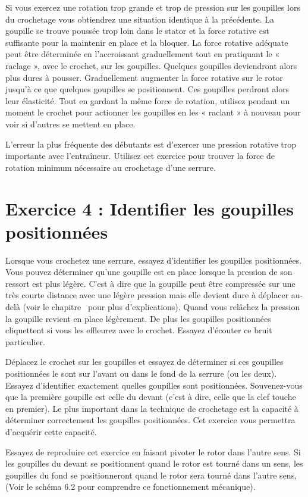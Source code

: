 \documentclass[a4paper,french,11pt,twoside]{report}
\begin{document}
Si vous exercez une rotation trop grande et trop de pression sur les goupilles lors du crochetage vous obtiendrez une situation identique à la précédente. La goupille se trouve poussée trop loin dans le stator et la force rotative est suffisante pour la maintenir en place et la bloquer. La force rotative adéquate peut être déterminée en l'accroissant graduellement tout en pratiquant le « raclage », avec le crochet, sur les goupilles. Quelques goupilles deviendront alors plus dures à pousser. Graduellement augmenter la force rotative sur le rotor jusqu'à ce que quelques goupilles se positionnent. Ces goupilles perdront alors leur élasticité. Tout en gardant la même force de rotation, utilisez pendant un moment le crochet pour actionner les goupilles en les « raclant » à nouveau pour voir si d'autres se mettent en place.

L'erreur la plus fréquente des débutants est d'exercer une pression rotative trop importante avec l'entraîneur. Utilisez cet exercice pour trouver la force de rotation minimum nécessaire au crochetage d'une serrure.

\section{Exercice 4 : Identifier les goupilles positionnées}

Lorsque vous crochetez une serrure, essayez d'identifier les goupilles positionnées. Vous pouvez déterminer qu'une goupille est en place lorsque la pression de son ressort est plus légère. C'est à dire que la goupille peut être compressée sur une très courte distance avec une légère pression mais elle devient dure à déplacer au-delà (voir le chapitre~ pour plus d'explications). Quand vous relâchez la pression la goupille revient en place légèrement. De plus les goupilles positionnées cliquettent si vous les effleurez avec le crochet. Essayez d'écouter ce bruit particulier.

Déplacez le crochet sur les goupilles et essayez de déterminer si ces goupilles positionnées le sont sur l'avant ou dans le fond de la serrure (ou les deux). Essayez d'identifier exactement quelles goupilles sont positionnées. Souvenez-vous que la première goupille est celle du devant (c'est à dire, celle que la clef touche en premier). Le plus important dans la technique de crochetage est la capacité à déterminer correctement les goupilles positionnées. Cet exercice vous permettra d'acquérir cette capacité.

Essayez de reproduire cet exercice en faisant pivoter le rotor dans l'autre sens. Si les goupilles du devant se positionnent quand le rotor est tourné dans un sens, les goupilles du fond se positionneront quand le rotor sera tourné dans l'autre sens, (Voir le schéma 6.2 pour comprendre ce fonctionnement mécanique).
\end{document}
